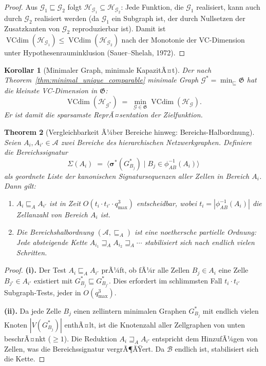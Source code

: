 ﻿\documentclass[12pt, a4paper, openany]{report}
\newtheorem{theorem}{Theorem}[chapter]
\newtheorem{corollary}[theorem]{Korollar}
\newcommand{\calG}{\mathcal{G}}
\newcommand{\calH}{\mathcal{H}}
\newcommand{\calA}{\mathcal{A}}
\newcommand{\calB}{\mathcal{B}}
\DeclareMathOperator{\VC}{VCdim}
\begin{document}
\begin{proof}
Aus $\calG_1 \sqsubseteq \calG_2$ folgt $\calH_{\calG_1} \subseteq \calH_{\calG_2}$:
Jede Funktion, die $\calG_1$ realisiert, kann auch durch $\calG_2$ realisiert
werden (da $\calG_1$ ein Subgraph ist, der durch Nullsetzen der Zusatzkanten
von $\calG_2$ reproduzierbar ist).  Damit ist
$\VC(\calH_{\calG_1}) \leq \VC(\calH_{\calG_2})$ nach der Monotonie der
VC-Dimension unter Hypothesenrauminklusion (Sauer--Shelah, 1972).
\end{proof}

\begin{corollary}[Minimaler Graph, minimale KapazitÃ¤t]
\label{cor:minimal_cap}
Der nach Theorem~\ref{thm:minimal_unique_comparable} minimale Graph
$\calG^* = \min_{\sqsubseteq} \mathfrak{G}$ hat die kleinste
VC-Dimension in $\mathfrak{G}$:
\[
  \VC(\calH_{\calG^*}) \;=\; \min_{\calG \in \mathfrak{G}} \VC(\calH_{\calG}).
\]
Er ist damit die \emph{sparsamste} ReprÃ¤sentation der Zielfunktion.
\end{corollary}

\begin{theorem}[Vergleichbarkeit Ã¼ber Bereiche hinweg: Bereichs-Halbordnung]
\label{thm:region_partial_order}
Seien $A_i, A_{i'} \in \calA$ zwei Bereiche des hierarchischen
Netzwerkgraphen.  Definiere die \emph{Bereichssignatur}
\[
  \Sigma(A_i) \;=\; \bigl\langle \bm{\sigma}^*(G^*_{B_j}) \;\big|\; B_j \in \phi_{AB}^{-1}(A_i) \bigr\rangle
\]
als geordnete Liste der kanonischen Signatursequenzen aller Zellen in
Bereich $A_i$.  Dann gilt:
\begin{enumerate}[label=(\roman*)]
  \item $A_i \sqsubseteq_A A_{i'}$ ist in Zeit
    $O(t_i \cdot t_{i'} \cdot q_{\max}^3)$ entscheidbar, wobei
    $t_i = |\phi_{AB}^{-1}(A_i)|$ die Zellanzahl von Bereich $A_i$ ist.
  \item Die Bereichshalbordnung $(\calA, \sqsubseteq_A)$ ist eine noethersche
    partielle Ordnung: Jede absteigende Kette $A_{i_1} \sqsupseteq_A A_{i_2} \sqsupseteq_A \cdots$
    stabilisiert sich nach endlich vielen Schritten.
\end{enumerate}
\end{theorem}

\begin{proof}
\textbf{(i).}
Der Test $A_i \sqsubseteq_A A_{i'}$ prÃ¼ft, ob fÃ¼r alle Zellen $B_j \in A_i$
eine Zelle $B_{j'} \in A_{i'}$ existiert mit $G^*_{B_j} \sqsubseteq G^*_{B_{j'}}$.
Dies erfordert im schlimmsten Fall $t_i \cdot t_{i'}$ Subgraph-Tests, jeder
in $O(q_{\max}^3)$.

\textbf{(ii).}
Da jede Zelle $B_j$ einen zellintern minimalen Graphen $G^*_{B_j}$ mit
endlich vielen Knoten $|V(G^*_{B_j})|$ enthÃ¤lt, ist die Knotenzahl aller
Zellgraphen von unten beschrÃ¤nkt ($\geq 1$).  Die Reduktion
$A_i \sqsupseteq_A A_{i'}$ entspricht dem HinzufÃ¼gen von Zellen, was die
Bereichssignatur vergrÃ¶ÃŸert.  Da $\calB$ endlich ist, stabilisiert sich
die Kette.
\end{proof}
\end{document}
